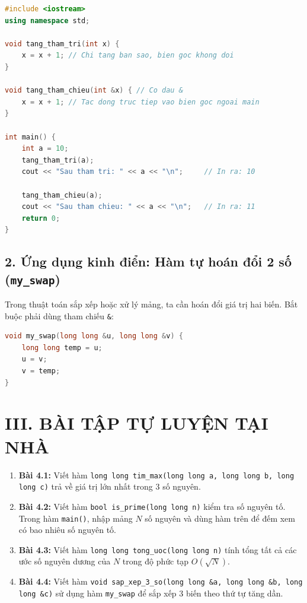 \documentclass[11pt,a4paper]{article}
\begin{document}
\begin{lstlisting}[language=C++]
#include <iostream>
using namespace std;

void tang_tham_tri(int x) {
    x = x + 1; // Chi tang ban sao, bien goc khong doi
}

void tang_tham_chieu(int &x) { // Co dau &
    x = x + 1; // Tac dong truc tiep vao bien goc ngoai main
}

int main() {
    int a = 10;
    tang_tham_tri(a);
    cout << "Sau tham tri: " << a << "\n";     // In ra: 10
    
    tang_tham_chieu(a);
    cout << "Sau tham chieu: " << a << "\n";   // In ra: 11
    return 0;
}
\end{lstlisting}

\subsection*{\color{AsianBlue}2. Ứng dụng kinh điển: Hàm tự hoán đổi 2 số (\texttt{my\_swap})}
Trong thuật toán sắp xếp hoặc xử lý mảng, ta cần hoán đổi giá trị hai biến. Bắt buộc phải dùng tham chiếu \texttt{\&}:
\begin{lstlisting}[language=C++]
void my_swap(long long &u, long long &v) {
    long long temp = u;
    u = v;
    v = temp;
}
\end{lstlisting}

\section*{\color{AsianDarkBlue}III. BÀI TẬP TỰ LUYỆN TẠI NHÀ}
\begin{enumerate}
    \setlength{\itemsep}{2pt}
    \small
    \item \textbf{Bài 4.1:} Viết hàm \texttt{long long tim\_max(long long a, long long b, long long c)} trả về giá trị lớn nhất trong 3 số nguyên.
    \item \textbf{Bài 4.2:} Viết hàm \texttt{bool is\_prime(long long n)} kiểm tra số nguyên tố. Trong hàm \texttt{main()}, nhập mảng $N$ số nguyên và dùng hàm trên để đếm xem có bao nhiêu số nguyên tố.
    \item \textbf{Bài 4.3:} Viết hàm \texttt{long long tong\_uoc(long long n)} tính tổng tất cả các ước số nguyên dương của $N$ trong độ phức tạp $O(\sqrt{N})$.
    \item \textbf{Bài 4.4:} Viết hàm \texttt{void sap\_xep\_3\_so(long long \&a, long long \&b, long long \&c)} sử dụng hàm \texttt{my\_swap} để sắp xếp 3 biến theo thứ tự tăng dần.
\end{enumerate}
\end{document}
